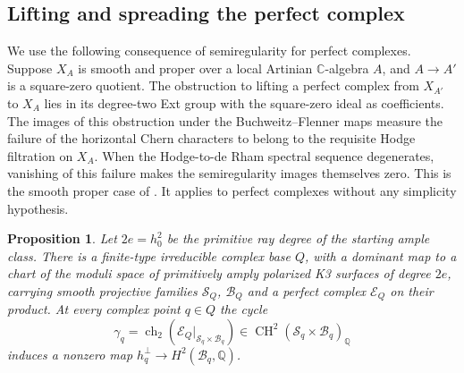 \documentclass[11pt]{article}
\numberwithin{equation}{section}
\newtheorem{proposition}[theorem]{Proposition}
\theoremstyle{definition}
\theoremstyle{remark}
\begin{document}
\subsection{Lifting and spreading the perfect complex}

We use the following consequence of semiregularity for perfect
complexes. Suppose $X_A$ is smooth and proper over a local Artinian
$\mathbb C$-algebra $A$, and $A\to A'$ is a square-zero quotient. The
obstruction to lifting a perfect complex from $X_{A'}$ to $X_A$
lies in its degree-two Ext group with the square-zero ideal as
coefficients. The images of this obstruction under the
Buchweitz--Flenner maps measure the failure of the horizontal Chern
characters to belong to the requisite Hodge filtration on $X_A$.
When the Hodge-to-de Rham spectral sequence degenerates, vanishing
of this failure makes the semiregularity images themselves zero.
This is the smooth proper case of
\cite[Corollary~2.25 and Remark~2.27]{Deformation:Pridham}.
It applies to perfect complexes without any simplicity hypothesis.

\begin{proposition}\label{prop:dominant-cycle-family}
Let $2e=h_0^2$ be the primitive ray degree of the starting ample
class. There is a finite-type irreducible complex base $Q$, with a
dominant map to a chart of the moduli space of primitively amply
polarized K3 surfaces of degree $2e$, carrying smooth projective
families $\mathcal S_Q$, $\mathcal B_Q$ and a perfect complex
$\mathcal E_Q$ on their product. At every complex point $q\in Q$
the cycle
\[
 \gamma_q=\operatorname{ch}_2(\mathcal E_Q|_{\mathcal S_q\times\mathcal B_q})
      \in\operatorname{CH}^2(\mathcal S_q\times\mathcal B_q)_\mathbb Q
\]
induces a nonzero map
$h_q^\perp\to H^2(\mathcal B_q,\mathbb Q)$.
\end{proposition}
\end{document}
